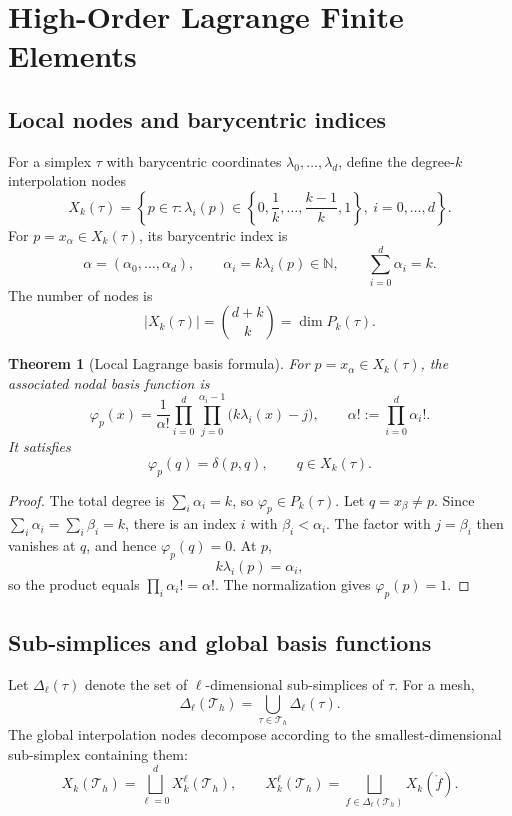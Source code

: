 \documentclass[11pt,a4paper]{article}
\newcommand{\N}{\mathbb{N}}
\newcommand{\Th}{\mathcal{T}_h}
\theoremstyle{definition}
\theoremstyle{plain}
\newtheorem{theorem}{Theorem}[section]
\theoremstyle{remark}
\theoremstyle{plain}
\begin{document}
\section{High-Order Lagrange Finite Elements}

\subsection{Local nodes and barycentric indices}
For a simplex $\tau$ with barycentric coordinates $\lambda_0,\ldots,\lambda_d$, define the degree-$k$ interpolation nodes
\[
  X_k(\tau)
  =\left\{p\in\tau:\lambda_i(p)\in
  \left\{0,\frac1k,\ldots,\frac{k-1}{k},1\right\},\ i=0,\ldots,d\right\}.
\]
For $p=x_\alpha\in X_k(\tau)$, its barycentric index is
\[
  \alpha=(\alpha_0,\ldots,\alpha_d),
  \qquad
  \alpha_i=k\lambda_i(p)\in\N,
  \qquad
  \sum_{i=0}^d\alpha_i=k.
\]
The number of nodes is
\[
  |X_k(\tau)|=\binom{d+k}{k}=\dim P_k(\tau).
\]

\begin{theorem}[Local Lagrange basis formula]
For $p=x_\alpha\in X_k(\tau)$, the associated nodal basis function is
\[
  \varphi_p(x)
  =\frac1{\alpha!}
  \prod_{i=0}^d\prod_{j=0}^{\alpha_i-1}
  \bigl(k\lambda_i(x)-j\bigr),
  \qquad
  \alpha!:=\prod_{i=0}^d\alpha_i!.
\]
It satisfies
\[
  \varphi_p(q)=\delta(p,q),\qquad q\in X_k(\tau).
\]
\end{theorem}

\begin{proof}
The total degree is $\sum_i\alpha_i=k$, so $\varphi_p\in P_k(\tau)$. Let $q=x_\beta\neq p$. Since $\sum_i\alpha_i=\sum_i\beta_i=k$, there is an index $i$ with $\beta_i<\alpha_i$. The factor with $j=\beta_i$ then vanishes at $q$, and hence $\varphi_p(q)=0$. At $p$,
\[
  k\lambda_i(p)=\alpha_i,
\]
so the product equals $\prod_i\alpha_i!=\alpha!$. The normalization gives $\varphi_p(p)=1$.
\end{proof}

\subsection{Sub-simplices and global basis functions}
Let $\Delta_\ell(\tau)$ denote the set of $\ell$-dimensional sub-simplices of $\tau$. For a mesh,
\[
  \Delta_\ell(\Th)=\bigcup_{\tau\in\Th}\Delta_\ell(\tau).
\]
The global interpolation nodes decompose according to the smallest-dimensional sub-simplex containing them:
\[
  X_k(\Th)=\bigsqcup_{\ell=0}^dX_k^\ell(\Th),
  \qquad
  X_k^\ell(\Th)=\bigsqcup_{f\in\Delta_\ell(\Th)}X_k(\mathring f).
\]
\end{document}
